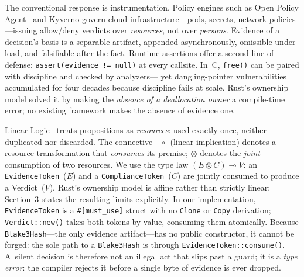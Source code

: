 The conventional response is instrumentation.
Policy engines such as Open Policy Agent~\cite{opa2024} and
Kyverno govern cloud infrastructure---pods, secrets, network policies---issuing
allow/deny verdicts over \emph{resources}, not over \emph{persons}.
Evidence of a decision's basis is a separable artifact, appended
asynchronously, omissible under load, and falsifiable after the fact.
Runtime assertions offer a second line of defense:
\texttt{assert(evidence != null)} at every callsite.
In~C, \texttt{free()} can be paired with discipline and checked by analyzers---
yet dangling-pointer vulnerabilities accumulated for four decades because
discipline fails at scale.
Rust's ownership model solved it by making the \emph{absence of a
deallocation owner} a compile-time error; no existing framework makes the
absence of evidence one.

Linear Logic~\cite{girard1987linear,wadler1991linear}
treats propositions as \emph{resources}: used exactly once, neither
duplicated nor discarded.
The connective $\multimap$ (linear implication) denotes a resource transformation
that \emph{consumes} its premise; $\otimes$ denotes the
\emph{joint} consumption of two resources.
We use the type law $(E \otimes C) \multimap V$:
an \texttt{EvidenceToken}~($E$) and a \texttt{ComplianceToken}~($C$)
are jointly consumed to produce a Verdict~($V$).
Rust's ownership model is affine rather than strictly linear; Section~3
states the resulting limits explicitly.  In our implementation,
\texttt{EvidenceToken} is a \texttt{\#[must\_use]}
struct with no \texttt{Clone} or \texttt{Copy} derivation;
\texttt{Verdict::new()} takes both tokens by value, consuming them atomically.
Because \texttt{Blake3Hash}---the only evidence artifact---has no public
constructor, it cannot be forged: the sole path to a \texttt{Blake3Hash}
is through \texttt{EvidenceToken::consume()}.
A~silent decision is therefore not an illegal act that slips past a guard;
it is a \emph{type error}:
the compiler rejects it before a single byte of evidence is ever dropped.

